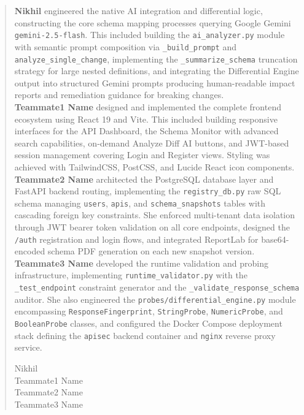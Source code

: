 \documentclass{fisatprojectfinal}
\begin{document}
\renewcommand\abstractname{Contribution by Author}
\begin{abstract}
\vspace{5cm}
\textbf{Nikhil} engineered the native AI integration and differential logic, constructing the core schema mapping processes querying Google Gemini \texttt{gemini-2.5-flash}. This included building the \texttt{ai\_analyzer.py} module with semantic prompt composition via \texttt{\_build\_prompt} and \texttt{analyze\_single\_change}, implementing the \texttt{\_summarize\_schema} truncation strategy for large nested definitions, and integrating the Differential Engine output into structured Gemini prompts producing human-readable impact reports and remediation guidance for breaking changes.\\[6pt]
\textbf{Teammate1 Name} designed and implemented the complete frontend ecosystem using React 19 and Vite. This included building responsive interfaces for the API Dashboard, the Schema Monitor with advanced search capabilities, on-demand Analyze Diff AI buttons, and JWT-based session management covering Login and Register views. Styling was achieved with TailwindCSS, PostCSS, and Lucide React icon components.\\[6pt]
\textbf{Teammate2 Name} architected the PostgreSQL database layer and FastAPI backend routing, implementing the \texttt{registry\_db.py} raw SQL schema managing \texttt{users}, \texttt{apis}, and \texttt{schema\_snapshots} tables with cascading foreign key constraints. She enforced multi-tenant data isolation through JWT bearer token validation on all core endpoints, designed the \texttt{/auth} registration and login flows, and integrated ReportLab for base64-encoded schema PDF generation on each new snapshot version.\\[6pt]
\textbf{Teammate3 Name} developed the runtime validation and probing infrastructure, implementing \texttt{runtime\_validator.py} with the \texttt{\_test\_endpoint} constraint generator and the \texttt{\_validate\_response\_schema} auditor. She also engineered the \texttt{probes/differential\_engine.py} module encompassing \texttt{ResponseFingerprint}, \texttt{StringProbe}, \texttt{NumericProbe}, and \texttt{BooleanProbe} classes, and configured the Docker Compose deployment stack defining the \texttt{apisec} backend container and \texttt{nginx} reverse proxy service.
\vspace{1cm}
\begin{flushright}
Nikhil\\
Teammate1 Name\\
Teammate2 Name\\
Teammate3 Name
\end{flushright}
\end{abstract}
\newpage
\end{document}
